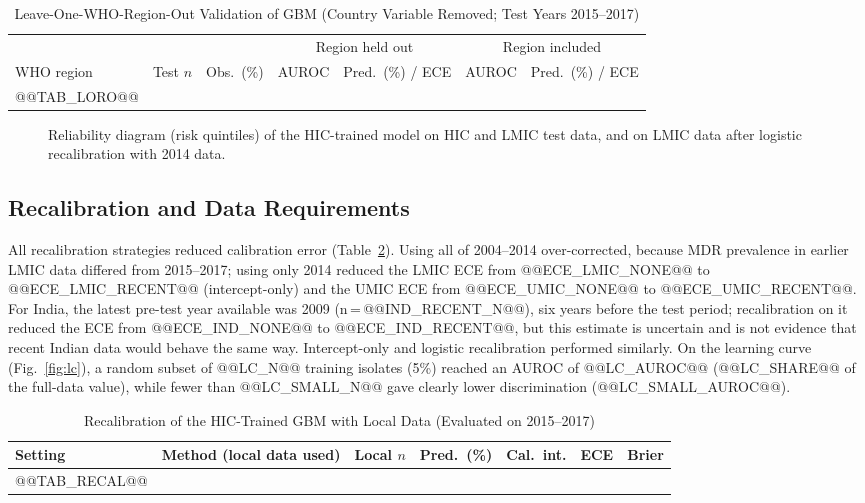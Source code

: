 \documentclass[conference]{IEEEtran}
\begin{document}
\begin{table}[!t]
\caption{Leave-One-WHO-Region-Out Validation of GBM (Country Variable Removed; Test Years 2015--2017)}\label{tab:loro}
\centering\footnotesize
\begin{tabular}{lrrcccc}
\toprule
 & & & \multicolumn{2}{c}{Region held out} & \multicolumn{2}{c}{Region included} \\
\cmidrule(lr){4-5}\cmidrule(lr){6-7}
WHO region & Test $n$ & Obs.\ (\%) & AUROC & Pred.\ (\%) / ECE & AUROC & Pred.\ (\%) / ECE \\
\midrule
@@TAB_LORO@@
\bottomrule
\end{tabular}
\end{table}

\begin{figure}[!t]
\centering

\caption{Reliability diagram (risk quintiles) of the HIC-trained model on HIC and LMIC test data, and on LMIC data after logistic recalibration with 2014 data.}
\label{fig:rel}
\end{figure}

\subsection{Recalibration and Data Requirements}
All recalibration strategies reduced calibration error (Table~\ref{tab:recal}). Using all of 2004--2014 over-corrected, because MDR prevalence in earlier LMIC data differed from 2015--2017; using only 2014 reduced the LMIC ECE from @@ECE_LMIC_NONE@@ to @@ECE_LMIC_RECENT@@ (intercept-only) and the UMIC ECE from @@ECE_UMIC_NONE@@ to @@ECE_UMIC_RECENT@@. For India, the latest pre-test year available was 2009 (n\,=\,@@IND_RECENT_N@@), six years before the test period; recalibration on it reduced the ECE from @@ECE_IND_NONE@@ to @@ECE_IND_RECENT@@, but this estimate is uncertain and is not evidence that recent Indian data would behave the same way. Intercept-only and logistic recalibration performed similarly. On the learning curve (Fig.~\ref{fig:lc}), a random subset of @@LC_N@@ training isolates (5\%) reached an AUROC of @@LC_AUROC@@ (@@LC_SHARE@@ of the full-data value), while fewer than @@LC_SMALL_N@@ gave clearly lower discrimination (@@LC_SMALL_AUROC@@).

\begin{table}[!t]
\caption{Recalibration of the HIC-Trained GBM with Local Data (Evaluated on 2015--2017)}\label{tab:recal}
\centering\footnotesize
\begin{tabular}{llrcccc}
\toprule
Setting & Method (local data used) & Local $n$ & Pred.\ (\%) & Cal.\ int. & ECE & Brier \\
\midrule
@@TAB_RECAL@@
\bottomrule
\end{tabular}
\end{table}
\end{document}
